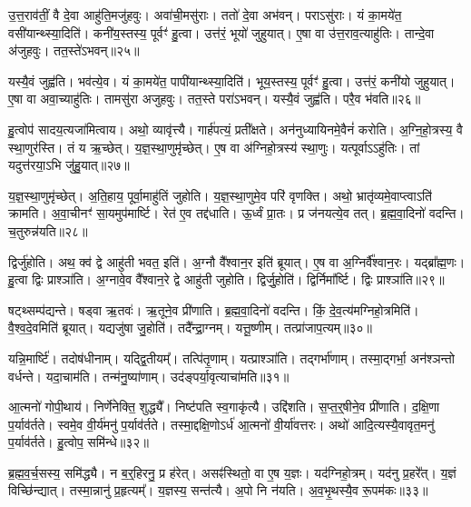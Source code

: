 उ॒त्त॒राव॑तीं॒ वै दे॒वा आहु॑ति॒मजु॑हवुः।
अवा॑ची॒मसु॑राः।
ततो॑ दे॒वा अभ॑वन्।
पराऽसु॑राः।
यं का॒मये॑त॒ वसी॑यान्थ्स्या॒दिति॑।
कनी॑य॒स्तस्य॒ पूर्वꣳ॑ हु॒त्वा।
उत्त॑रं॒ भूयो॑ जुहुयात्।
ए॒षा वा उ॑त्त॒राव॒त्याहु॑तिः।
तान्दे॒वा अ॑जुहवुः।
तत॒स्ते॑\-ऽभवन्॥२५॥\ip

यस्यै॒वं जुह्व॑ति।
भव॑त्ये॒व।
यं का॒मये॑त॒ पापी॑यान्थ्स्या॒दिति॑।
भूय॒स्तस्य॒ पूर्वꣳ॑ हु॒त्वा।
उत्त॑रं॒ कनी॑यो जुहुयात्।
ए॒षा वा अवा॒च्याहु॑तिः।
तामसु॑रा अजुहवुः।
तत॒स्ते परा॑\-ऽभवन्।
यस्यै॒वं जुह्व॑ति।
परै॒व भ॑वति॥२६॥\ip

हु॒त्वोप॑ सादय॒त्यजा॑मित्वाय।
अथो॒ व्यावृ॑त्त्यै।
गार्\mbox{}ह॑पत्यं॒ प्रती᳚क्षते।
अन॑नुध्यायिनमे॒वैनं॑ करोति।
अ॒ग्नि॒हो॒त्रस्य॒ वै स्था॒णुर॑स्ति।
तं य ऋ॒च्छेत्।
य॒ज्ञ॒स्था॒णुमृ॑च्छेत्।
ए॒ष वा अ॑ग्निहो॒त्रस्य॑ स्था॒णुः।
यत्पूर्वा\-ऽऽहु॑तिः।
तां यदुत्त॑रया॒ऽभि जु॑हु॒यात्॥२७॥\ip

य॒ज्ञ॒स्था॒णुमृ॑च्छेत्।
अ॒ति॒हाय॒ पूर्वा॒माहु॑तिं जुहोति।
य॒ज्ञ॒स्था॒णुमे॒व परि॑ वृणक्ति।
अथो॒ भ्रातृ॑व्यमे॒वाप्त्वाऽति॑ क्रामति।
अ॒वा॒चीनꣳ॑ सा॒यमुप॑मार्ष्टि।
रेत॑ ए॒व तद्द॑धाति।
ऊ॒र्ध्वं प्रा॒तः।
प्र ज॑नयत्ये॒व तत्।
ब्र॒ह्म॒वा॒दिनो॑ वदन्ति।
च॒तुरुन्न॑यति॥२८॥\ip

द्विर्जु॑होति।
अथ॒ क्व॑ द्वे आहु॑ती भवत॒ इति॑।
अ॒ग्नौ वै᳚श्वान॒र इति॑ ब्रूयात्।
ए॒ष वा अ॒ग्निर्वै᳚श्वान॒रः।
यद्ब्रा᳚ह्म॒णः।
हु॒त्वा द्विः प्राश्ञा॑ति।
अ॒ग्नावे॒व वै᳚श्वान॒रे द्वे आहु॑ती जुहोति।
द्विर्जु॒होति॑।
द्विर्निमा᳚र्ष्टि।
द्विः प्राश्ञा॑ति॥२९॥\ip

षट्थ्सम्प॑द्यन्ते।
षड्वा ऋ॒तवः॑।
ऋ॒तूने॒व प्री॑णाति।
ब्र॒ह्म॒वा॒दिनो॑ वदन्ति।
किं॒ दे॒व॒त्य॑मग्निहो॒त्रमिति॑।
वै॒श्व॒दे॒वमिति॑ ब्रूयात्।
यद्यजु॑षा जु॒होति॑।
तदै᳚न्द्रा॒ग्नम्।
यत्तू॒ष्णीम्।
तत्प्रा॑जाप॒त्यम्॥३०॥\ip

यन्नि॒मार्ष्टि॑।
तदोष॑धीनाम्।
यद्द्वि॒तीयम्᳚।
तत्पि॑तृ॒णाम्।
यत्प्राश्ञा॑ति।
तद्गर्भा॑णाम्।
तस्मा॒द्गर्भा॒ अन॑श्ञन्तो वर्धन्ते।
यदा॒चाम॑ति।
तन्म॑नु॒ष्या॑णाम्।
उद॑ङ्पर्या॒वृत्याचा॑मति॥३१॥\ip

आ॒त्मनो॑ गोपी॒थाय॑।
निर्णे॑नेक्ति॒ शुद्ध्यै᳚।
निष्ट॑पति स्व॒गाकृ॑त्यै।
उद्दि॑शति।
स॒प्त॒र्॒षीने॒व प्री॑णाति।
द॒क्षि॒णा प॒र्याव॑र्तते।
स्वमे॒व वी॒र्य॑मनु॑ प॒र्याव॑र्तते।
तस्मा॒द्दक्षि॒णो\-ऽर्ध॑ आ॒त्मनो॑ वी॒र्या॑वत्तरः।
अथो॑ आदि॒त्यस्यै॒वावृत॒मनु॑ प॒र्याव॑र्तते।
हु॒त्वोप॒ समि॑न्धे॥३२॥\ip

ब्र॒ह्म॒व॒र्च॒सस्य॒ समि॑द्ध्यै।
न ब॒र्॒हिरनु॒\- प्र ह॑रेत्।
असꣴ॑स्थितो॒ वा ए॒ष य॒ज्ञः।
यद॑ग्निहो॒त्रम्।
यद॑नु प्र॒हरे᳚त्।
य॒ज्ञं वि\-च्छि॑न्द्यात्।
तस्मा॒न्नानु॑ प्र॒हृत्यम्᳚।
य॒ज्ञस्य॒ सन्त॑त्यै।
अ॒पो नि न॑यति।
अ॒व॒भृ॒थस्यै॒व रू॒पम॑कः॥३३॥\ip\anuvakamend[अ॒भ॒व॒न्भ॒व॒ति॒ जु॒हु॒यान्न॑यति मार्ष्टि॒ द्विः प्राश्ञा॑ति प्राजाप॒त्यमाचा॑मतीन्धे\-ऽकः]

